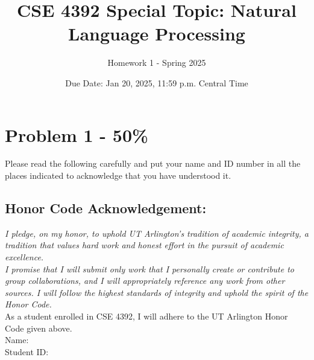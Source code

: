 \documentclass{article}
\newcommand{\answerboxbig}{
    \vspace{20cm} %
}
\begin{document}
\title{CSE 4392 Special Topic: Natural Language Processing}
\author{Homework 1 - Spring 2025}
\date{Due Date: Jan 20, 2025, 11:59 p.m. Central Time}
\maketitle
\thispagestyle{fancy}


\section*{Problem 1 - 50\%}

Please read the following carefully and put your name and ID number
in all the places indicated to acknowledge that you have understood it.

\subsection*{Honor Code Acknowledgement:}
\textit{I pledge, on my honor, to uphold UT Arlington’s tradition of academic integrity, a tradition that
values hard work and honest effort in the pursuit of academic excellence.\\
\newline
I promise that I will submit only work that I personally create or contribute to group collaborations,
and I will appropriately reference any work from other sources. I will follow the highest standards
of integrity and uphold the spirit of the Honor Code.}\\
\newline
As a student enrolled in CSE 4392, I will adhere to the UT Arlington Honor Code given above.\\
\newline
Name:\\
Student ID:\\
\answerboxbig
\end{document}
